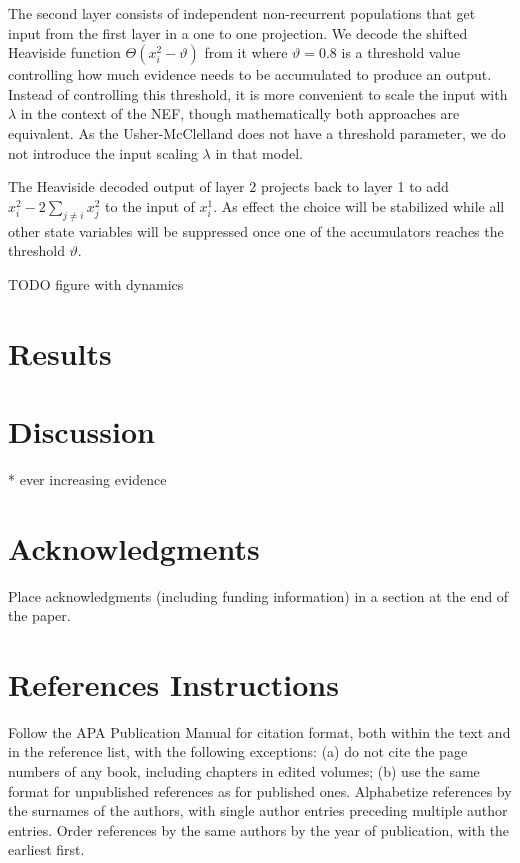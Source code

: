 \documentclass[10pt,letterpaper]{article}
\begin{document}
The second layer consists of independent non-recurrent populations that get 
input from the first layer in a one to one projection. We decode the shifted 
Heaviside function $\Theta(x^2_i - \vartheta)$ from it where $\vartheta = 0.8$ 
is a threshold value controlling how much evidence needs to be accumulated to 
produce an output. Instead of controlling this threshold, it is more convenient 
to scale the input with $\lambda$ in the context of the NEF, though 
mathematically both approaches are equivalent. As the Usher-McClelland does not 
have a threshold parameter, we do not introduce the input scaling $\lambda$ in 
that model.

The Heaviside decoded output of layer 2 projects back to layer 1 to add $x^2_i 
- 2\sum_{j \neq i} x^2_j$ to the input of $x^1_i$. As effect the choice will be 
stabilized while all other state variables will be suppressed once one of the 
accumulators reaches the threshold $\vartheta$.

TODO figure with dynamics

\section{Results}

\section{Discussion}
* ever increasing evidence

\section{Acknowledgments}

Place acknowledgments (including funding information) in a section at
the end of the paper.


\section{References Instructions}

Follow the APA Publication Manual for citation format, both within the
text and in the reference list, with the following exceptions: (a) do
not cite the page numbers of any book, including chapters in edited
volumes; (b) use the same format for unpublished references as for
published ones. Alphabetize references by the surnames of the authors,
with single author entries preceding multiple author entries. Order
references by the same authors by the year of publication, with the
earliest first.
\end{document}
